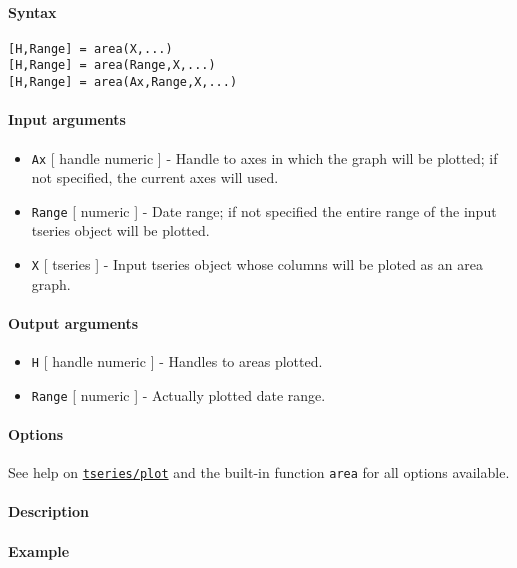 


	\paragraph{Syntax}\label{syntax}

\begin{verbatim}
[H,Range] = area(X,...)
[H,Range] = area(Range,X,...)
[H,Range] = area(Ax,Range,X,...)
\end{verbatim}

\paragraph{Input arguments}\label{input-arguments}

\begin{itemize}
\item
  \texttt{Ax} {[} handle \textbar{} numeric {]} - Handle to axes in
  which the graph will be plotted; if not specified, the current axes
  will used.
\item
  \texttt{Range} {[} numeric {]} - Date range; if not specified the
  entire range of the input tseries object will be plotted.
\item
  \texttt{X} {[} tseries {]} - Input tseries object whose columns will
  be ploted as an area graph.
\end{itemize}

\paragraph{Output arguments}\label{output-arguments}

\begin{itemize}
\item
  \texttt{H} {[} handle \textbar{} numeric {]} - Handles to areas
  plotted.
\item
  \texttt{Range} {[} numeric {]} - Actually plotted date range.
\end{itemize}

\paragraph{Options}\label{options}

See help on \href{tseries/plot}{\texttt{tseries/plot}} and the built-in
function \texttt{area} for all options available.

\paragraph{Description}\label{description}

\paragraph{Example}\label{example}



